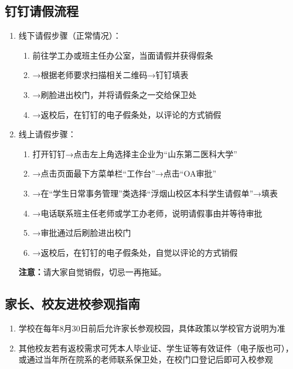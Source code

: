 \subsection[钉钉请假流程]{钉钉请假\footnotemark 流程}
\label{leave_dingtalk}
\begin{enumerate}
    \item 线下请假步骤（正常情况）：
          \begin{enumerate}
              \item 前往学工办或班主任办公室，当面请假并获得假条
              \item →根据老师要求扫描相关二维码→钉钉填表
              \item →刷脸进出校门，并将请假条之一交给保卫处
              \item →返校后，在钉钉的电子假条处，以评论的方式销假
          \end{enumerate}
    \item 线上请假步骤：
          \begin{enumerate}
              \item 打开钉钉→点击左上角选择主企业为“山东第二医科大学”
              \item →点击页面最下方菜单栏“工作台”→点击“OA审批”
              \item →在“学生日常事务管理”类选择“浮烟山校区本科学生请假单”→填表
              \item →电话联系班主任老师或学工办老师，说明请假事由并等待审批
              \item →审批通过后刷脸进出校门
              \item →返校后，在钉钉的电子假条处，自觉以评论的方式销假
          \end{enumerate}
          \textbf{注意：}请大家自觉销假，切忌一再拖延。
\end{enumerate}

\subsection[家长、校友进校参观指南]{家长、校友进校参观指南\footnotemark}
\begin{enumerate}
    \item 学校在每年8月30日前后允许家长参观校园\footnotemark，具体政策以学校官方说明为准
    \item 其他校友若有返校需求可凭本人毕业证、学生证等有效证件（电子版也可），或通过当年所在院系的老师联系保卫处，在校门口登记后即可入校参观
\end{enumerate}

